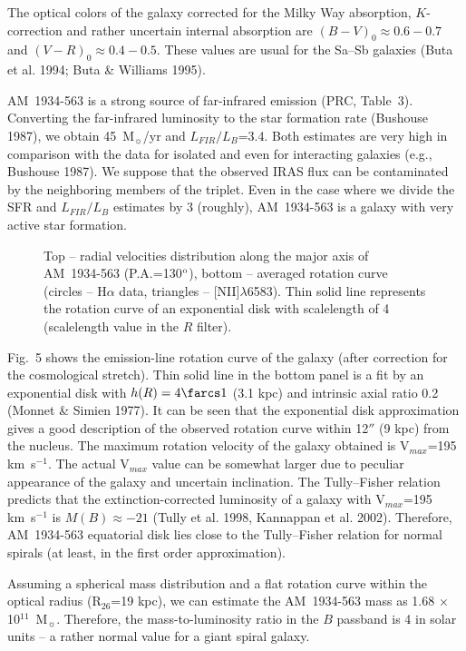 \documentclass[]{aa}
\begin{document}
The optical colors of the galaxy corrected for the Milky Way
absorption, $K$-correction and rather uncertain internal absorption
are $(B-V)_0\approx0.6-0.7$ and $(V-R)_0\approx0.4-0.5$. 
These values are usual for the Sa--Sb galaxies (Buta et al. 1994;
Buta \& Williams 1995).

AM~1934-563 is a strong source of far-infrared emission (PRC, Table~3).
Converting the far-infrared luminosity to the star formation rate
(Bushouse 1987), we obtain 45~M$_{\sun}$/yr and $L_{FIR}/L_B$=3.4. 
Both estimates are very high in comparison with the data for isolated and 
even for interacting galaxies (e.g., Bushouse 1987). We suppose that
the observed IRAS flux can be contaminated by the neighboring 
members of the triplet. Even in the case where we
divide the SFR and $L_{FIR}/L_B$ estimates by 3 (roughly), AM~1934-563
is a galaxy with very active star formation.

\begin{figure}
\centerline{}
\caption{Top -- radial velocities distribution along the major axis of
AM~1934-563 (P.A.=130$^{\rm o}$), 
bottom -- averaged rotation curve (circles -- H$\alpha$
data, triangles -- [NII]$\lambda$6583). Thin solid line represents 
the rotation curve of an exponential disk with scalelength of 4 
(scalelength value in the $R$ filter).}
\end{figure}

Fig.~5 shows the emission-line rotation curve of the galaxy (after
correction for the cosmological stretch). Thin solid line in
the bottom panel is a fit by an exponential disk with
$h(R)=4\farcs1$ (3.1 kpc) and intrinsic axial ratio 0.2 (Monnet \&
Simien 1977). It
can be seen that the exponential disk approximation gives a good
description of the observed rotation curve within 12$''$ (9 kpc) from the
nucleus. The maximum rotation velocity of the galaxy obtained 
is V$_{max}$=195 km~s$^{-1}$. The actual V$_{max}$
value can be somewhat larger due to peculiar appearance of the 
galaxy and uncertain inclination. The Tully--Fisher
relation predicts that the extinction-corrected luminosity of
a galaxy with V$_{max}$=195 km~s$^{-1}$ is $M(B)\approx-21$ (Tully et al. 1998,
Kannappan et al. 2002). Therefore, AM~1934-563 equatorial disk lies close to 
the Tully--Fisher relation for normal spirals (at least, in the
first order approximation). 

Assuming a spherical mass distribution and a flat rotation curve
within the optical radius (R$_{26}$=19 kpc), we can estimate
the AM~1934-563 mass as 1.68 $\times$ 10$^{11}$~M$_{\sun}$. 
Therefore, the mass-to-luminosity ratio in the $B$ passband is 4 
in solar units -- a rather normal value for a giant spiral galaxy. 
\end{document}
